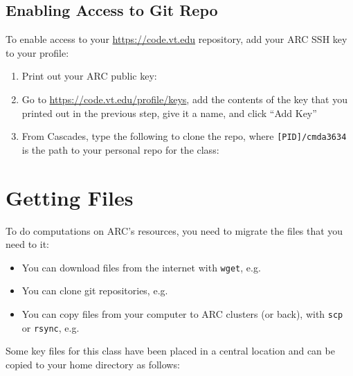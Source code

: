 \subsection{Enabling Access to Git Repo}
To enable access to your \url{https://code.vt.edu} repository, add your ARC SSH key to your profile:
\begin{enumerate}
  \item Print out your ARC public key:
  \item Go to \url{https://code.vt.edu/profile/keys}, add the contents of the key that you printed out in the previous step, give it a name, and click ``Add Key''
  \item From Cascades, type the following to clone the repo, where \texttt{[PID]/cmda3634} is the path to your personal repo for the class: 
\end{enumerate}

\section{Getting Files}
To do computations on ARC's resources, you need to migrate the files that you need to it:
\begin{itemize}
  \item You can download files from the internet with \texttt{wget}, e.g.
  \item You can clone git repositories, e.g.
  \item You can copy files from your computer to ARC clusters (or back), with \texttt{scp} or \texttt{rsync}, e.g.
\end{itemize}
Some key files for this class have been placed in a central location and can be copied to your home directory as follows:

